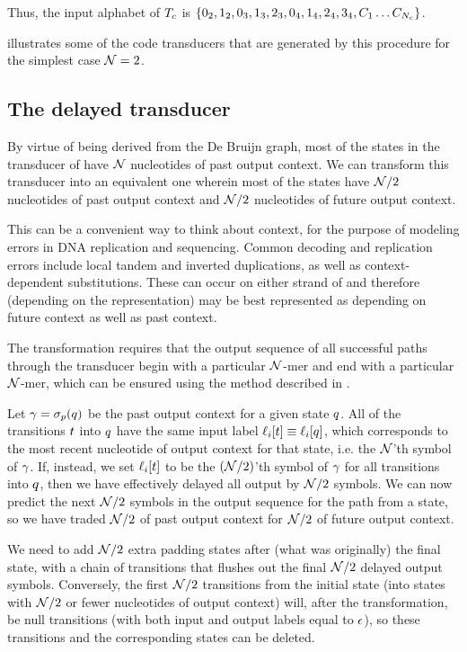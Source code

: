 \documentclass[english]{article}
\begin{document}
Thus, the input alphabet of $T_c$
is $\{ 0_2, 1_2,
       0_3, 1_3, 2_3,
       0_4, 1_4, 2_4, 3_4,
       C_{1} \ldots C_{N_c} \}$.

 illustrates some of the code transducers that are generated by this procedure for the simplest case ${\cal N}=2$.
       
\subsection{The delayed transducer}

By virtue of being derived from the De Bruijn graph, most of the states in the transducer of 
have ${\cal N}$ nucleotides of past output context.
We can transform this transducer into an equivalent one wherein most of the states have
${\cal N}/2$ nucleotides of past output context
and ${\cal N}/2$ nucleotides of future output context.

This can be a convenient way to think about context, for the purpose of modeling errors in DNA replication and sequencing.
Common decoding and replication errors include local tandem and inverted duplications, as well as context-dependent substitutions.
These can occur on either strand of and therefore (depending on the representation) may be best represented as depending
on future context as well as past context.

The transformation requires that the output sequence of all successful paths through the transducer
begin with a particular ${\cal N}$-mer and end with a particular ${\cal N}$-mer,
which can be ensured using the method described in .

Let $\gamma = \sigma_p(q)$ be the past output context for a given state $q$.
All of the transitions $t$ into $q$ have the same input label $\ell_i[t] \equiv \ell_i[q]$,
which corresponds to the most recent nucleotide of output context for that state,
i.e. the ${\cal N}$'th symbol of $\gamma$.
If, instead, we set $\ell_i[t]$ to be the $({\cal N}/2)$'th symbol of $\gamma$
for all transitions into $q$, then we have effectively delayed all output by ${\cal N}/2$ symbols.
We can now predict the next ${\cal N}/2$ symbols in the output sequence for the path from a state,
so we have traded ${\cal N}/2$ of past output context for ${\cal N}/2$ of future output context.

We need to add ${\cal N}/2$ extra padding states after (what was originally) the final state,
with a chain of transitions that flushes out the final ${\cal N}/2$ delayed output symbols.
Conversely, the first ${\cal N}/2$ transitions from the initial state
(into states with ${\cal N}/2$ or fewer nucleotides of output context)
will, after the transformation,
be null transitions (with both input and output labels equal to $\epsilon$),
so these transitions and the corresponding states can be deleted.
\end{document}
